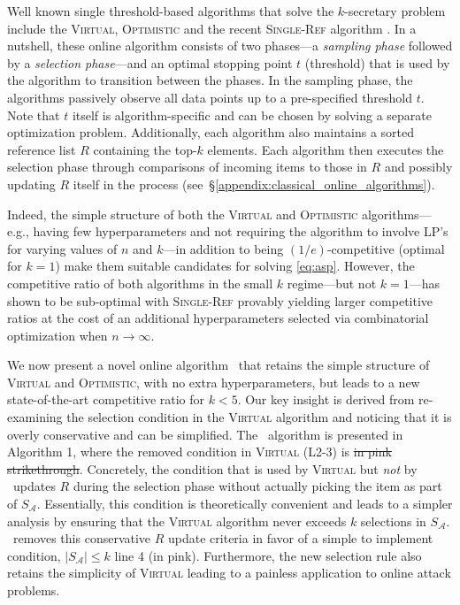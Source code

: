 Well known single threshold-based algorithms that solve the $k$-secretary problem include the \textsc{Virtual}, \textsc{Optimistic} \cite{babaioff2007knapsack} and the recent \textsc{Single-Ref} algorithm \cite{albers2019improved}. In a nutshell, these online algorithm consists of two phases---a \textit{sampling phase} followed by a \textit{selection phase}---and an optimal stopping point $t$ (threshold) that is used by the algorithm to transition between the phases. In the sampling phase, the algorithms passively observe all data points up to a pre-specified threshold $t$. Note that $t$ itself is algorithm-specific and can be chosen by solving a separate optimization problem. Additionally, each algorithm also maintains a sorted reference list $R$ containing the top-$k$ elements. Each algorithm then executes the selection phase through comparisons of incoming items to those in $R$ and possibly updating $R$ itself in the process (see~\S\ref{appendix:classical_online_algorithms}).

Indeed, the simple structure of both the \textsc{Virtual} and \textsc{Optimistic} algorithms---e.g., having few hyperparameters and not requiring the algorithm to involve LP's for varying values of $n$ and $k$---in addition to being $(1/e)$-competitive (optimal for $k=1$) make them suitable candidates for solving \eqref{eq:asp}. However, 
the competitive ratio of both algorithms in the small $k$ regime---but not $k=1$---has shown to be sub-optimal with \textsc{Single-Ref} provably yielding larger competitive ratios at the cost of an additional hyperparameters selected via combinatorial optimization when $n \to \infty$. 

We now present a novel online algorithm \algoname\ that retains the simple structure of \textsc{Virtual} and \textsc{Optimistic}, with no extra hyperparameters, but leads to a new state-of-the-art competitive ratio for $k<5$. Our key insight is derived from re-examining the selection condition in the \textsc{Virtual} algorithm and noticing that it is overly conservative and can be simplified. The \algoname\ algorithm is presented in Algorithm 1, where the removed condition in \textsc{Virtual} (L2-3) is \st{in pink strikethrough}. Concretely, the condition that is used by \textsc{Virtual} but \emph{not} by \algoname\ updates $R$ during the selection phase without actually picking the item as part of $S_{\mathcal{A}}$. Essentially, this condition is theoretically convenient and leads to a simpler analysis by ensuring that the \textsc{Virtual} algorithm never exceeds $k$ selections in $S_{\mathcal{A}}$. \algoname\ removes this conservative $R$ update criteria in favor of a simple to implement condition, $|S_{\mathcal{A}}| \leq k$ line 4 {\color{salmon}(in pink)}. Furthermore, the new selection rule also retains the simplicity of \textsc{Virtual} leading to a painless application to online attack problems.

